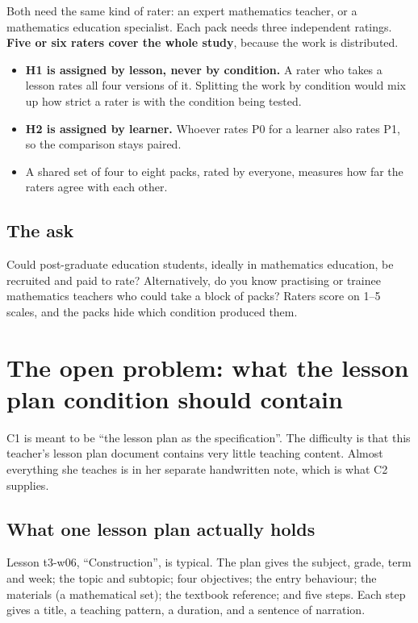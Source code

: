 \documentclass[11pt,a4paper]{article}
\begin{document}
Both need the same kind of rater: an expert mathematics teacher, or a mathematics education
specialist. Each pack needs three independent ratings. \textbf{Five or six raters cover the
whole study}, because the work is distributed.

\begin{itemize}
\item \textbf{H1 is assigned by lesson, never by condition.} A rater who takes a lesson
rates all four versions of it. Splitting the work by condition would mix up how strict a
rater is with the condition being tested.
\item \textbf{H2 is assigned by learner.} Whoever rates P0 for a learner also rates P1, so
the comparison stays paired.
\item A shared set of four to eight packs, rated by everyone, measures how far the raters
agree with each other.
\end{itemize}

\subsection{The ask}

Could post-graduate education students, ideally in mathematics education, be recruited and
paid to rate? Alternatively, do you know practising or trainee mathematics teachers who
could take a block of packs? Raters score on 1--5 scales, and the packs hide which
condition produced them.

\clearpage

\section{The open problem: what the lesson plan condition should contain}

C1 is meant to be ``the lesson plan as the specification''. The difficulty is that this
teacher's lesson plan document contains very little teaching content. Almost everything she
teaches is in her separate handwritten note, which is what C2 supplies.

\subsection{What one lesson plan actually holds}

Lesson t3-w06, ``Construction'', is typical. The plan gives the subject, grade, term and
week; the topic and subtopic; four objectives; the entry behaviour; the materials
(a mathematical set); the textbook reference; and five steps. Each step gives a title, a
teaching pattern, a duration, and a sentence of narration.
\end{document}
